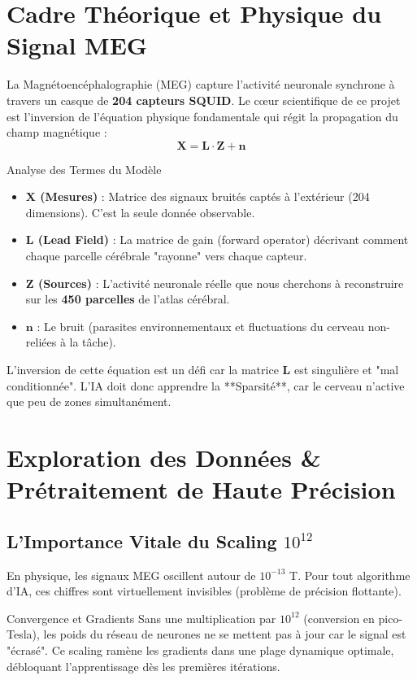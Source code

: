 \documentclass[a4paper,11pt]{article}
\begin{document}
\section{Cadre Théorique et Physique du Signal MEG}
La Magnétoencéphalographie (MEG) capture l'activité neuronale synchrone à travers un casque de \textbf{204 capteurs SQUID}. Le cœur scientifique de ce projet est l'inversion de l'équation physique fondamentale qui régit la propagation du champ magnétique :
\begin{equation}
    \mathbf{X} = \mathbf{L} \cdot \mathbf{Z} + \mathbf{n}
\end{equation}

\begin{techbox}{Analyse des Termes du Modèle}
    \begin{itemize}
        \item \textbf{\(\mathbf{X}\) (Mesures)} : Matrice des signaux bruités captés à l'extérieur (204 dimensions). C'est la seule donnée observable.
        \item \textbf{\(\mathbf{L}\) (Lead Field)} : La matrice de gain (forward operator) décrivant comment chaque parcelle cérébrale "rayonne" vers chaque capteur. 
        \item \textbf{\(\mathbf{Z}\) (Sources)} : L'activité neuronale réelle que nous cherchons à reconstruire sur les \textbf{450 parcelles} de l'atlas cérébral.
        \item \textbf{\(\mathbf{n}\)} : Le bruit (parasites environnementaux et fluctuations du cerveau non-reliées à la tâche).
    \end{itemize}
\end{techbox}
L'inversion de cette équation est un défi car la matrice \(\mathbf{L}\) est singulière et "mal conditionnée". L'IA doit donc apprendre la **Sparsité**, car le cerveau n'active que peu de zones simultanément.

\section{Exploration des Données \& Prétraitement de Haute Précision}
\subsection{L'Importance Vitale du Scaling \(10^{12}\)}
En physique, les signaux MEG oscillent autour de \(10^{-13}\) T. Pour tout algorithme d'IA, ces chiffres sont virtuellement invisibles (problème de précision flottante).
\begin{techbox}{Convergence et Gradients}
    Sans une multiplication par \textbf{\(10^{12}\)} (conversion en pico-Tesla), les poids du réseau de neurones ne se mettent pas à jour car le signal est "écrasé". Ce scaling ramène les gradients dans une plage dynamique optimale, débloquant l'apprentissage dès les premières itérations.
\end{techbox}
\end{document}
